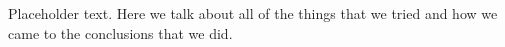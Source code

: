 Placeholder text. Here we talk about all of the things that we tried and how we came to the conclusions that we did.
